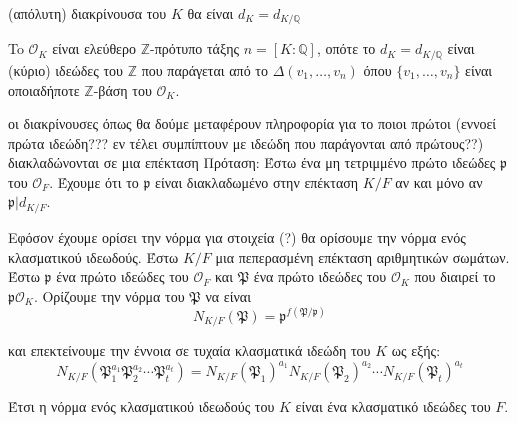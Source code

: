 \documentclass[oneside,a4paper]{article}
\newcommand{\Z}{\mathbb{Z}}
\newcommand{\Q}{\mathbb{Q}}
\begin{document}
(απόλυτη) διακρίνουσα του $K$ θα είναι $d_K = d_{K/\Q}$

To $\mathcal{O}_K$ είναι ελεύθερο $\Z$-πρότυπο τάξης $n = [K:\Q]$, οπότε το $d_K = d_{K/\Q}$ είναι (κύριο) ιδεώδες του $\Z$ που παράγεται από το $\Delta(v_1,\ldots,v_n)$ όπου $\{v_1,\ldots,v_n\}$ είναι οποιαδήποτε $\Z$-βάση του $\mathcal{O}_K$.





οι διακρίνουσες όπως θα δούμε μεταφέρουν πληροφορία για το ποιοι πρώτοι (εννοεί πρώτα ιδεώδη??? εν τέλει συμπίπτουν με ιδεώδη που παράγονται από πρώτους??) διακλαδώνονται σε μια επέκταση
Πρόταση: Έστω ένα μη τετριμμένο πρώτο ιδεώδες $\mathfrak{p}$ του $\mathcal{O}_F$. Έχουμε ότι το $\mathfrak{p}$ είναι διακλαδωμένο στην επέκταση $K/F$ αν και μόνο αν $\mathfrak{p} | d_{K/F}$.

Εφόσον έχουμε ορίσει την νόρμα για στοιχεία (?) θα ορίσουμε την νόρμα ενός κλασματικού ιδεωδούς.
Έστω $K/F$ μια πεπερασμένη επέκταση αριθμητικών σωμάτων. Έστω $\mathfrak{p}$ ένα πρώτο ιδεώδες του $\mathcal{O}_F$ και $\mathfrak{P}$ ένα πρώτο ιδεώδες του $\mathcal{O}_K$ που διαιρεί το $\mathfrak{p} \mathcal{O}_K$.
Ορίζουμε την νόρμα του $\mathfrak{P}$ να είναι
$$N_{K/F}(\mathfrak{P}) = \mathfrak{p}^{f(\mathfrak{P}/\mathfrak{p})}$$

και επεκτείνουμε την έννοια σε τυχαία κλασματικά ιδεώδη του $K$ ως εξής:
$$N_{K/F}(\mathfrak{P}^{a_1}_1 \mathfrak{P}^{a_2}_2 \cdots \mathfrak{P}^{a_t}_t) = N_{K/F}(\mathfrak{P}_1)^{a_1} N_{K/F}(\mathfrak{P}_2)^{a_2} \cdots N_{K/F}(\mathfrak{P}_t)^{a_t}$$




Έτσι η νόρμα ενός κλασματικού ιδεωδούς του $K$ είναι ένα κλασματικό ιδεώδες του $F$.
\end{document}
